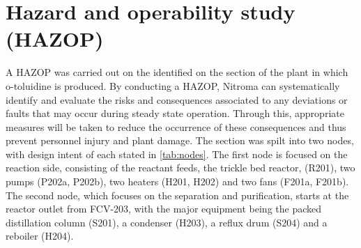 \section{Hazard and operability study (HAZOP) }
 
A HAZOP was carried out on the identified on the section of the plant in which o-toluidine is produced. By conducting a HAZOP, Nitroma can systematically identify and evaluate the risks and consequences associated to any deviations or faults that may occur during steady state operation. Through this, appropriate measures will be taken to reduce the occurrence of these consequences and thus prevent personnel injury and plant damage. The section was spilt into two nodes, with design intent of each stated in \cref{tab:nodes}. The first node is focused on the reaction side, consisting of the reactant feeds, the trickle bed reactor, (R201), two pumps (P202a, P202b), two heaters (H201, H202) and two fans (F201a, F201b). The second node, which focuses on the separation and purification, starts at the reactor outlet from FCV-203, with the major equipment being the packed distillation column (S201), a condenser (H203), a reflux drum (S204) and a reboiler (H204). 


 

